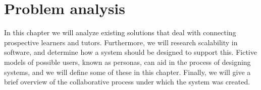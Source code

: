 \chapter{Problem analysis}\label{ch:problem-analysis}
In this chapter we will analyze existing solutions that deal with connecting prospective learners and tutors.
Furthermore, we will research scalability in software, and determine how a system should be designed to support this.
Fictive models of possible users, known as personas, can aid in the process of designing systems, and we will define some of these in this chapter.
Finally, we will give a brief overview of the collaborative process under which the system was created.






